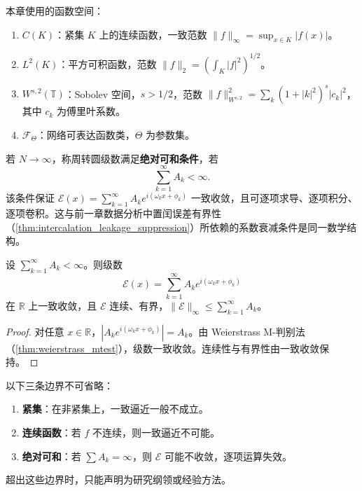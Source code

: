 \begin{definition}[函数类]\label{def:function-classes}
本章使用的函数空间：
\begin{enumerate}[label=(\roman*)]
    \item $C(K)$：紧集 $K$ 上的连续函数，一致范数 $\|f\|_\infty=\sup_{x\in K}|f(x)|$。
    \item $L^2(K)$：平方可积函数，范数 $\|f\|_2=\left(\int_K|f|^2\right)^{1/2}$。
    \item $W^{s,2}(\mathbb T)$：Sobolev 空间，$s>1/2$，范数 $\|f\|_{W^{s,2}}^2=\sum_{k}(1+|k|^2)^s|c_k|^2$，其中 $c_k$ 为傅里叶系数。
    \item $\mathcal F_\Theta$：网络可表达函数类，$\Theta$ 为参数集。
\end{enumerate}
\end{definition}

\begin{definition}[绝对可和系数条件]\label{def:absolute-summability}
若 $N\to\infty$，称周转圆级数满足\textbf{绝对可和条件}，若
\[
\sum_{k=1}^{\infty}A_k<\infty.
\]
该条件保证 $\mathcal E(x)=\sum_{k=1}^{\infty}A_k e^{i(\omega_k x+\phi_k)}$ 一致收敛，且可逐项求导、逐项积分、逐项卷积。这与前一章数据分析中置闰误差有界性（\cref{thm:intercalation_leakage_suppression}）所依赖的系数衰减条件是同一数学结构。
\end{definition}

\begin{lemma}[绝对可和下的收敛性]\label{lem:absolute-summability-convergence}
设 $\sum_{k=1}^{\infty}A_k<\infty$。则级数
\[
\mathcal E(x)=\sum_{k=1}^{\infty}A_k e^{i(\omega_k x+\phi_k)}
\]
在 $\mathbb R$ 上一致收敛，且 $\mathcal E$ 连续、有界，$\|\mathcal E\|_\infty\le\sum_{k=1}^{\infty}A_k$。
\end{lemma}

\begin{proof}
对任意 $x\in\mathbb R$，$|A_k e^{i(\omega_k x+\phi_k)}|=A_k$。由 Weierstrass M-判别法（\cref{thm:weierstrass_mtest}），级数一致收敛。连续性与有界性由一致收敛保持。
\end{proof}

\begin{remark}[边界条件的必要性]\label{rem:boundary-necessity}
以下三条边界不可省略：
\begin{enumerate}[label=(\roman*)]
    \item \textbf{紧集}：在非紧集上，一致逼近一般不成立。
    \item \textbf{连续函数}：若 $f$ 不连续，则一致逼近不可能。
    \item \textbf{绝对可和}：若 $\sum A_k=\infty$，则 $\mathcal E$ 可能不收敛，逐项运算失效。
\end{enumerate}
超出这些边界时，只能声明为研究纲领或经验方法。
\end{remark}

